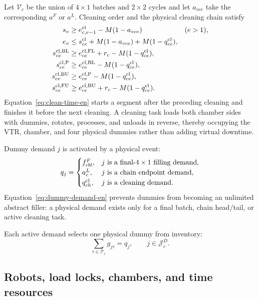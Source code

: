 \documentclass[journal]{IEEEtran}
\begin{document}
Let $\mathcal V_c$ be the union of $4\times1$ batches and $2\times2$ cycles and let $a_{vce}$ take the corresponding $a^F$ or $a^L$. Cleaning order and the physical cleaning chain satisfy
\begin{equation}
\begin{aligned}
s_v&\ge e^{\rm cl}_{c,e-1}-M(1-a_{vce}) &&(e>1),\\
e_v&\le s^{\rm cl}_{ce}+M(1-a_{vce})+M(1-q^{\rm cl}_{ce}),\\
s^{\rm cl,BL}_{ce}&\ge e^{\rm cl,FL}_{ce}+r_c-M(1-q^{\rm cl}_{ce}),\\
s^{\rm cl,P}_{ce}&\ge e^{\rm cl,BL}_{ce}-M(1-q^{\rm cl}_{ce}),\\
s^{\rm cl,BU}_{ce}&\ge e^{\rm cl,P}_{ce}-M(1-q^{\rm cl}_{ce}),\\
s^{\rm cl,FU}_{ce}&\ge e^{\rm cl,BU}_{ce}+r_c-M(1-q^{\rm cl}_{ce}).
\end{aligned}
\label{eq:clean-time-en}
\end{equation}
Equation~\eqref{eq:clean-time-en} starts a segment after the preceding cleaning and finishes it before the next cleaning. A cleaning task loads both chamber sides with dummies, rotates, processes, and unloads in reverse, thereby occupying the VTR, chamber, and four physical dummies rather than adding virtual downtime.

Dummy demand $j$ is activated by a physical event:
\begin{equation}
q_j=
\begin{cases}
f^F_{cbl},&j\text{ is a final-$4\times1$ filling demand},\\
a^L_c,&j\text{ is a chain endpoint demand},\\
q^{\rm cl}_{ch},&j\text{ is a cleaning demand}.
\end{cases}
\label{eq:dummy-demand-en}
\end{equation}
Equation~\eqref{eq:dummy-demand-en} prevents dummies from becoming an unlimited abstract filler: a physical demand exists only for a final batch, chain head/tail, or active cleaning task.

Each active demand selects one physical dummy from inventory:
\begin{equation}
\sum_{\tau\in\mathcal T_c}g_{j\tau}=q_j,
\qquad j\in\mathcal J_c^D.
\label{eq:dummy-assign-en}
\end{equation}
\subsection{Robots, load locks, chambers, and time resources}
\end{document}
